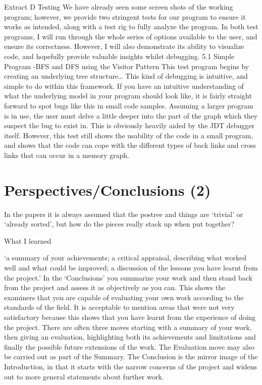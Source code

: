 \documentclass[12pt]{article}
\let\stdsection\section
\renewcommand\section{\newpage\stdsection}
\begin{document}
Extract D Testing 
We have already seen some screen shots of the working program; however, we provide two stringent tests 
for our program to ensure it works as intended, along with a test rig to fully analyze the program. In both test 
programs, I will run through the whole series of options available to the user, and ensure its correctness. 
However, I will also demonstrate its ability to visualize code, and hopefully provide valuable insights whilst 
debugging. 
5.1 Simple Program -BFS and DFS using the Visitor Pattern
This test program begins by creating an underlying tree structure…
This kind of debugging is intuitive, and simple to do within this framework. If you have an intuitive 
understanding of what the underlying model in your program should look like, it is fairly straight forward to 
spot bugs like this in  small code samples. Assuming a larger program is in use, the user must delve a little 
deeper into the part of the graph which they suspect the bug to exist in. This is obviously heavily aided by the 
JDT debugger itself. However, this test still shows the usability of the code in a small program, and shows 
that the code can cope with the different types of back links and cross links that can occur in a memory 
graph.

\section{Perspectives/Conclusions (2)}

In the papers it is always assumed that the postree and things are `trivial' or `already sorted', but how do the pieces really stack up when put together?

What I learned

‘a summary of your achievements; a critical appraisal, describing what worked well and what could be 
improved; a discussion of the lessons you have learnt from the project.’
In the ‘Conclusions’ you summarize your work and then stand back from the project and assess it as 
objectively as you can. This shows the examiners that you are capable of evaluating your own work 
according to the standards of the field. It is acceptable to mention areas that were not very satisfactory
because this shows that you have learnt from the experience of doing the project.
There are often three moves starting with a summary of your work, then giving an evaluation, highlighting
both its achievements and limitations and finally the possible future extensions of the work. The Evaluation 
move may also be carried out as part of the Summary. The Conclusion is the mirror image of the 
Introduction, in that it starts with the narrow concerns of the project and widens out to more general 
statements about further work.
\end{document}
